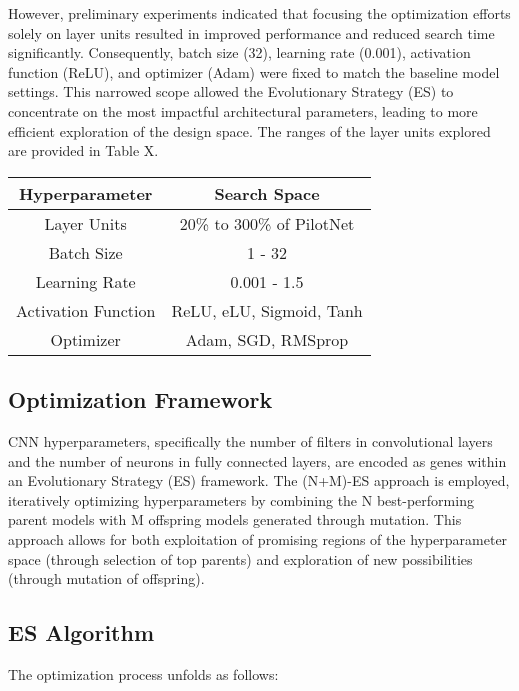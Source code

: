 \documentclass[conference]{IEEEtran}
\begin{document}
However, preliminary experiments indicated that focusing the optimization efforts solely on layer units resulted in improved performance and reduced search time significantly. Consequently, batch size (32), learning rate (0.001), activation function (ReLU), and optimizer (Adam) were fixed to match the baseline model settings. This narrowed scope allowed the Evolutionary Strategy (ES) to concentrate on the most impactful architectural parameters, leading to more efficient exploration of the design space. The ranges of the layer units explored are provided in Table X.

\begin{tabular}{ |c|c| }
    \hline
    \textbf{Hyperparameter} & \textbf{Search Space}     \\ \hline
    Layer Units             & 20\% to 300\% of PilotNet \\ \hline
    Batch Size              & 1 - 32                    \\ \hline
    Learning Rate           & 0.001 - 1.5               \\ \hline
    Activation Function     & ReLU, eLU, Sigmoid, Tanh  \\ \hline
    Optimizer               & Adam, SGD, RMSprop        \\ \hline
\end{tabular}

\subsection{Optimization Framework}

CNN hyperparameters, specifically the number of filters in convolutional layers and the number of neurons in fully connected layers, are encoded as genes within an Evolutionary Strategy (ES) framework. The (N+M)-ES approach is employed, iteratively optimizing hyperparameters by combining the N best-performing parent models with M offspring models generated through mutation. This approach allows for both exploitation of promising regions of the hyperparameter space (through selection of top parents) and exploration of new possibilities (through mutation of offspring).

\subsection{ES Algorithm}

The optimization process unfolds as follows:
\end{document}
